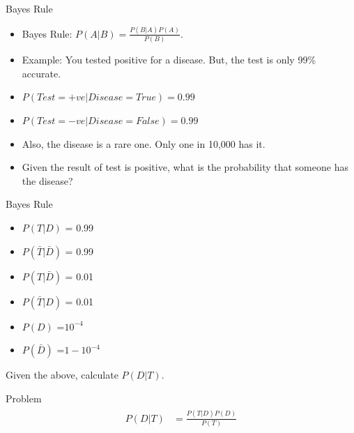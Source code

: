 \documentclass{beamer}
\begin{document}
	

\begin{frame}{Bayes Rule}
\begin{itemize}[<+->]
	\item Bayes Rule: $P(A | B) = \frac{P(B|A)P(A)}{P(B)}$.
	\item Example:  You tested positive for a disease. But, the test is only 99\% accurate.
	\item $P(Test = +ve | Disease = True) = 0.99$
	 \item $P(Test = -ve | Disease = False) = 0.99$
	 \item Also, the disease is a rare one. Only one in 10,000 has it.
	 \item Given the result of test is positive, what is the probability that someone has the disease?
\end{itemize}
\end{frame}

\begin{frame}{Bayes Rule}
\begin{itemize}
	\item $P(T|D)$ = 0.99
	\item $P(\bar{T}|\bar{D})$ = 0.99
	\item $P(T|\bar{D})$ = 0.01
	\item $P(\bar{T}|D)$ = 0.01
	\item $P(D)$ =$ 10^{-4}$
	\item $P(\bar{D})$ =$ 1 - 10^{-4}$
\end{itemize}

Given the above, calculate $P(D|T)$. 
\end{frame}

\begin{frame}{Problem}
\begin{align}
\label{eqn*:eqlabel}
\begin{split}
P(D|T) &= \frac{P(T|D)P(D)}{P(T)}
\end{split}
\end{align}



\end{frame}
\end{document}
